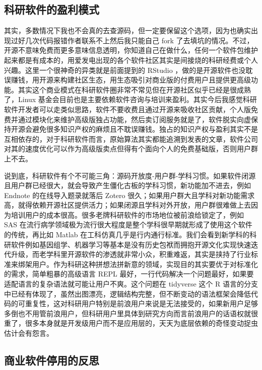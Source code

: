 \documentclass[
]{book}
\begin{document}
\hypertarget{ux79d1ux7814ux8f6fux4ef6ux7684ux76c8ux5229ux6a21ux5f0f}{%
\subsection{科研软件的盈利模式}\label{ux79d1ux7814ux8f6fux4ef6ux7684ux76c8ux5229ux6a21ux5f0f}}

其实，多数情况下我也不会真的去查源码，但一定要保留这个选项，因为也确实出现过好几次代码报错作者联系不上然后我只能自己 fork 了去填坑的情况。不过，开源不意味免费而更多意味信息透明，你知道自己在做什么，任何一个软件包维护起来都是有成本的，用爱发电出现的各个软件社区其实是间接烧的科研经费或个人兴趣。这里一个很神奇的异类就是前面提到的 RStudio ，做的是开源软件也没耽误赚钱，用开源来构建社区生态，用生态吸引对商业版的付费用户且提供更高级功能。其实这个商业模式在科研软件圈非常不常见但在开源社区似乎已经是很成熟了，Linux 基金会目前也是主要依赖软件咨询与培训来盈利。其实今后我感觉科研软件开发者可以走类似思路，软件不要收费且通过开源来吸收社区贡献，个人版免费并通过模块化来维护高级版独占功能，然后卖订阅服务就是了，软件脱实向虚保持开源会避免很多知识产权的麻烦且不耽误赚钱。独占的知识产权与盈利其实不是互相依存的，对于科研软件而言，原始算法其实都能追溯到发表的文章，软件公司对其的速度优化可以作为高级版卖点但得有个面向个人的免费基础版，否则用户群上不去。

说到底，科研软件有个不可能三角：源码开放度-用户群-学科习惯。如果软件闭源且用户群已经很大，就会导致产生僵化古板的学科习惯，新功能加不进去，例如 Endnote 的在线导入题录就落后 Zotero 很久；如果用户群大且学科对新功能需求高，就得依赖开源社区提供活力；如果闭源且学科对外开放，用户群很难做上去因为培训用户的成本很高。很多老牌科研软件的市场地位被前浪给锁定了，例如 SAS 在流行病学领域极为流行很大程度是整个学科很早期就形成了使用这个软件的传统，再比如 Matlab 在工科仿真几乎是行内通行标准。我们会看到新学科的科研软件例如基因组学、机器学习等基本是没有历史包袱而拥抱开源文化实现快速迭代升级，而老学科里开源软件的渗透就非常小众，积重难返，其实是挟持了行业标准来绑架用户。作为科研这种拼想法拼新意的领域，实现目的其实要优于对标准化的需求，简单粗暴的高级语言 REPL 最好，一行代码解决一个问题最好，如果要适配语言的复杂语法就可能让用户不爽。这个问题在 tidyverse 这个 R 语言的分支中已经有体现了，虽然出图漂亮，逻辑结构完整，但不断变动的语法框架会降低代码的可重复性，这对科研用户特别是前浪用户来说是无法接受的，如果新用户足够多倒也不用管前浪用户，但科研用户里具体到研究方向而言前浪用户的话语权就很重了，很多本身就是开发级用户而不是应用层的，天天为底层依赖的奇怪变动捉虫估计会有怨言。

\hypertarget{ux5546ux4e1aux8f6fux4ef6ux505cux7528ux7684ux53cdux601d}{%
\subsection{商业软件停用的反思}\label{ux5546ux4e1aux8f6fux4ef6ux505cux7528ux7684ux53cdux601d}}
\end{document}
